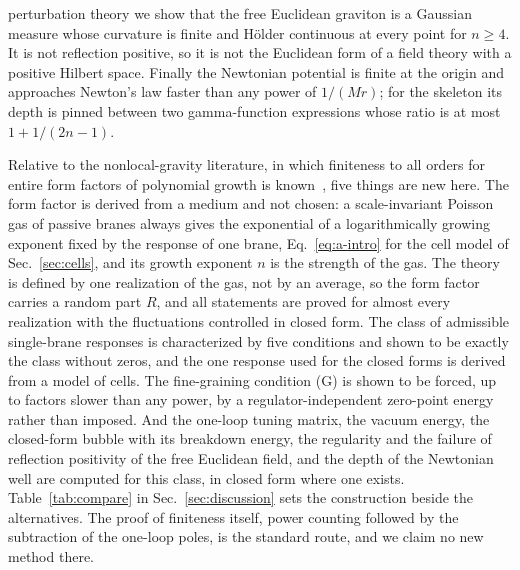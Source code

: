 \documentclass[a4paper,11pt]{article}
\begin{document}
perturbation theory we show that the free Euclidean graviton is a Gaussian measure whose curvature is finite and H\"older continuous at every point for $n\ge4$. It is not reflection positive, so it is not the Euclidean form of a field theory with a positive Hilbert space. Finally the Newtonian potential is finite at the origin and approaches Newton's law faster than any power of $1/(Mr)$; for the skeleton its depth is pinned between two gamma-function expressions whose ratio is at most $1+1/(2n-1)$.

Relative to the nonlocal-gravity literature, in which finiteness to all orders for entire form factors of polynomial growth is known~\cite{Tomboulis1997,Modesto2012,ModestoRachwal2014}, five things are new here. The form factor is derived from a medium and not chosen: a scale-invariant Poisson gas of passive branes always gives the exponential of a logarithmically growing exponent fixed by the response of one brane, Eq.~\eqref{eq:a-intro} for the cell model of Sec.~\ref{sec:cells}, and its growth exponent $n$ is the strength of the gas. The theory is defined by one realization of the gas, not by an average, so the form factor carries a random part $R$, and all statements are proved for almost every realization with the fluctuations controlled in closed form. The class of admissible single-brane responses is characterized by five conditions and shown to be exactly the class without zeros, and the one response used for the closed forms is derived from a model of cells. The fine-graining condition (G) is shown to be forced, up to factors slower than any power, by a regulator-independent zero-point energy rather than imposed. And the one-loop tuning matrix, the vacuum energy, the closed-form bubble with its breakdown energy, the regularity and the failure of reflection positivity of the free Euclidean field, and the depth of the Newtonian well are computed for this class, in closed form where one exists. Table~\ref{tab:compare} in Sec.~\ref{sec:discussion} sets the construction beside the alternatives. The proof of finiteness itself, power counting followed by the subtraction of the one-loop poles, is the standard route, and we claim no new method there.
\end{document}
